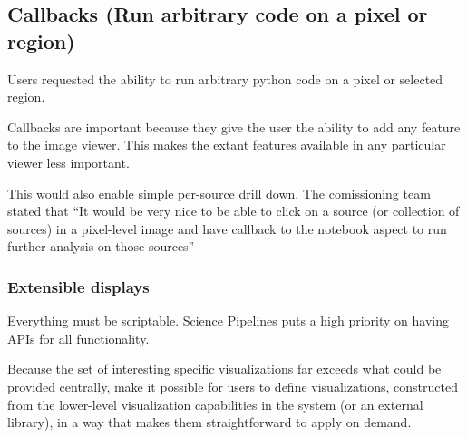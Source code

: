 \subsection{Callbacks (Run arbitrary code on a pixel or region)}

Users requested the ability to run arbitrary python code on a pixel or selected region.

Callbacks are important because they give the user the ability to add any feature to the image viewer.
This makes the extant features available in any particular viewer less important.

This would also enable simple per-source drill down.
The comissioning team stated that  ``It would be very nice to be able to click on a source (or collection of sources) in a pixel-level image and have callback to the notebook aspect to run further analysis on those sources''


\subsubsection{Extensible displays}
Everything must be scriptable.
Science Pipelines puts a high priority on having APIs for all functionality. 

Because the set of interesting specific visualizations far exceeds what could be provided centrally, make it possible for users to define visualizations, constructed from the lower-level visualization capabilities in the system (or an external library), in a way that makes them straightforward to apply on demand.

